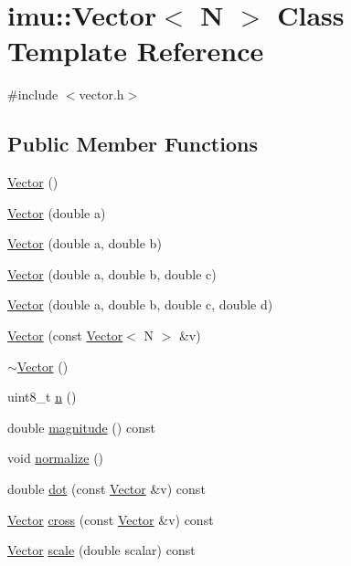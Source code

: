 \hypertarget{classimu_1_1Vector}{}\section{imu\+:\+:Vector$<$ N $>$ Class Template Reference}
\label{classimu_1_1Vector}


{\ttfamily \#include $<$vector.\+h$>$}

\subsection*{Public Member Functions}
\begin{DoxyCompactItemize}
\item 
\hyperlink{classimu_1_1Vector_a667a1005471e4fcebf73ead95876a47b}{Vector} ()
\item 
\hyperlink{classimu_1_1Vector_a5c5865e4675a523be019b59e7dd6e71d}{Vector} (double a)
\item 
\hyperlink{classimu_1_1Vector_ac866dc18a2dde71d4ed75fcf17985b37}{Vector} (double a, double b)
\item 
\hyperlink{classimu_1_1Vector_a2f4376bea64f28af31577f4a3714f685}{Vector} (double a, double b, double c)
\item 
\hyperlink{classimu_1_1Vector_a22e00ac9fb47009559e09bd426699307}{Vector} (double a, double b, double c, double d)
\item 
\hyperlink{classimu_1_1Vector_ab24875305dcee04f43d98983805128dc}{Vector} (const \hyperlink{classimu_1_1Vector}{Vector}$<$ N $>$ \&v)
\item 
\hyperlink{classimu_1_1Vector_a7c0e81f19910f0822e23075be2fe48e0}{$\sim$\+Vector} ()
\item 
uint8\+\_\+t \hyperlink{classimu_1_1Vector_acbe8633e10a39a8affc84be62cf8ea6d}{n} ()
\item 
double \hyperlink{classimu_1_1Vector_a3d19aa791bf10c6bd96924612602f7aa}{magnitude} () const 
\item 
void \hyperlink{classimu_1_1Vector_a89ee6ee911143e28e21424607db1af12}{normalize} ()
\item 
double \hyperlink{classimu_1_1Vector_a121578d9bb50ab0564a614af32c8a0d9}{dot} (const \hyperlink{classimu_1_1Vector}{Vector} \&v) const 
\item 
\hyperlink{classimu_1_1Vector}{Vector} \hyperlink{classimu_1_1Vector_aeafdd771084430ec844cae7bf1fe675b}{cross} (const \hyperlink{classimu_1_1Vector}{Vector} \&v) const 
\item 
\hyperlink{classimu_1_1Vector}{Vector} \hyperlink{classimu_1_1Vector_a02c5bef0285da3874175b59a8e664e3e}{scale} (double scalar) const 

\end{DoxyCompactItemize}
